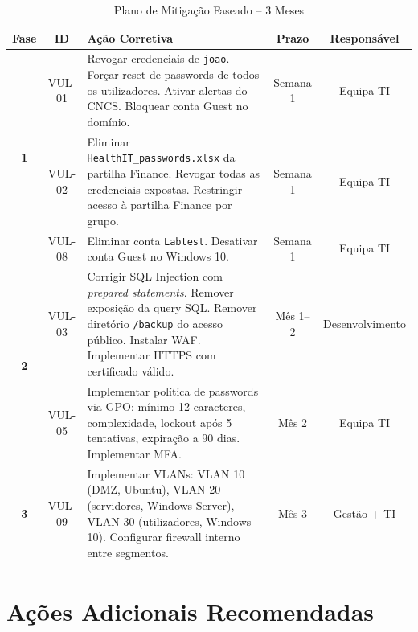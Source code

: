 \documentclass[12pt, a4paper]{report}
\newcommand{\thead}[1]{\bfseries\small\color{white}#1}
\begin{document}
\begin{table}[H]
\centering
\caption{Plano de Mitigação Faseado -- 3 Meses}
\begin{tabularx}{\linewidth}{c c X c c}
\toprule
\rowcolor{TableHead}
\thead{Fase} & \thead{ID} & \thead{Ação Corretiva} & \thead{Prazo} & \thead{Responsável} \\
\midrule
\multirow{3}{*}{\textbf{1}}
  & VUL-01 & Revogar credenciais de \texttt{joao}. Forçar reset de passwords de todos os
    utilizadores. Ativar alertas do CNCS. Bloquear conta Guest no domínio.
    & Semana 1 & Equipa TI \\
  \cline{2-5}
  & VUL-02 & Eliminar \texttt{HealthIT\_passwords.xlsx} da partilha Finance. Revogar todas
    as credenciais expostas. Restringir acesso à partilha Finance por grupo.
    & Semana 1 & Equipa TI \\
  \cline{2-5}
  & VUL-08 & Eliminar conta \texttt{Labtest}. Desativar conta Guest no Windows 10.
    & Semana 1 & Equipa TI \\
\midrule
\multirow{2}{*}{\textbf{2}}
  & VUL-03 & Corrigir SQL Injection com \textit{prepared statements}. Remover exposição da
    query SQL. Remover diretório \texttt{/backup} do acesso público. Instalar WAF.
    Implementar HTTPS com certificado válido.
    & Mês 1--2 & Desenvolvimento \\
  \cline{2-5}
  & VUL-05 & Implementar política de passwords via GPO: mínimo 12 caracteres, complexidade,
    lockout após 5 tentativas, expiração a 90 dias. Implementar MFA.
    & Mês 2 & Equipa TI \\
\midrule
\textbf{3}
  & VUL-09 & Implementar VLANs: VLAN 10 (DMZ, Ubuntu), VLAN 20 (servidores, Windows Server),
    VLAN 30 (utilizadores, Windows 10). Configurar firewall interno entre segmentos.
    & Mês 3 & Gestão + TI \\
\bottomrule
\end{tabularx}
\end{table}

\section{Ações Adicionais Recomendadas}
\end{document}
